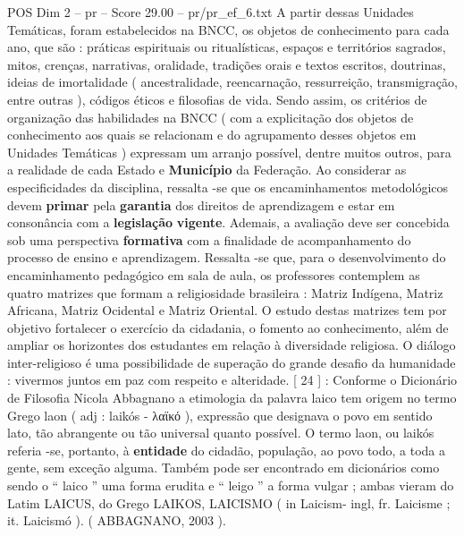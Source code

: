 \begin{textsample}{POS Dim 2 – pr – Score 29.00 – pr/pr\_ef\_6.txt}
A partir dessas Unidades Temáticas, foram estabelecidos na BNCC, os objetos de conhecimento para cada ano, que são : práticas espirituais ou ritualísticas, espaços e territórios sagrados, mitos, crenças, narrativas, oralidade, tradições orais e textos escritos, doutrinas, ideias de imortalidade ( ancestralidade, reencarnação, ressurreição, transmigração, entre outras ), códigos éticos e filosofias de vida.
Sendo assim, os critérios de organização das habilidades na BNCC ( com a explicitação dos objetos de conhecimento aos quais se relacionam e do agrupamento desses objetos em Unidades Temáticas ) expressam um arranjo possível, dentre muitos outros, para a realidade de cada Estado e \textbf{Município} da Federação.
Ao considerar as especificidades da disciplina, ressalta -se que os encaminhamentos metodológicos devem \textbf{primar} pela \textbf{garantia} dos direitos de aprendizagem e estar em consonância com a \textbf{legislação} \textbf{vigente}.
Ademais, a avaliação deve ser concebida sob uma perspectiva \textbf{formativa} com a finalidade de acompanhamento do processo de ensino e aprendizagem.
Ressalta -se que, para o desenvolvimento do encaminhamento pedagógico em sala de aula, os professores contemplem as quatro matrizes que formam a religiosidade brasileira : Matriz Indígena, Matriz Africana, Matriz Ocidental e Matriz Oriental.
O estudo destas matrizes tem por objetivo fortalecer o exercício da cidadania, o fomento ao conhecimento, além de ampliar os horizontes dos estudantes em relação à diversidade religiosa.
O diálogo inter-religioso é uma possibilidade de superação do grande desafio da humanidade : vivermos juntos em paz com respeito e alteridade. [ 24 ] : Conforme o Dicionário de Filosofia Nicola Abbagnano a etimologia da palavra laico tem origem no termo Grego laon ( adj : laikós - λαϊκό ), expressão que designava o povo em sentido lato, tão abrangente ou tão universal quanto possível.
O termo laon, ou laikós referia -se, portanto, à \textbf{entidade} do cidadão, população, ao povo todo, a toda a gente, sem exceção alguma.
Também pode ser encontrado em dicionários como sendo o “ laico ” uma forma erudita e “ leigo ” a forma vulgar ; ambas vieram do Latim LAICUS, do Grego LAIKOS, LAICISMO ( in Laicism- ingl, fr.
Laicisme ; it.
Laicismó ). ( ABBAGNANO, 2003 ).

\end{textsample}
